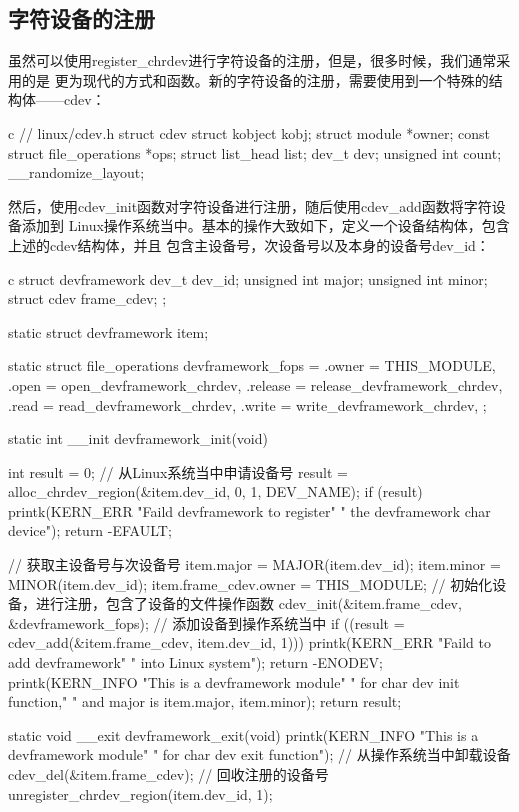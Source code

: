 \subsection{字符设备的注册}
虽然可以使用register\_chrdev进行字符设备的注册，但是，很多时候，我们通常采用的是
更为现代的方式和函数。新的字符设备的注册，需要使用到一个特殊的结构体——cdev：
\begin{code-block}{c}
// linux/cdev.h
struct cdev {
        struct kobject kobj;
        struct module *owner;
        const struct file_operations *ops;
        struct list_head list;
        dev_t dev;
        unsigned int count;
} __randomize_layout;
\end{code-block}
然后，使用cdev\_init函数对字符设备进行注册，随后使用cdev\_add函数将字符设备添加到
Linux操作系统当中。基本的操作大致如下，定义一个设备结构体，包含上述的cdev结构体，并且
包含主设备号，次设备号以及本身的设备号dev\_id：
\begin{code-block}{c}
struct devframework {
        dev_t dev_id;
        unsigned int major;
        unsigned int minor;
        struct cdev frame_cdev;
};

static struct devframework item;

static struct file_operations devframework_fops = {
        .owner = THIS_MODULE,
        .open = open_devframework_chrdev,
        .release = release_devframework_chrdev,
        .read = read_devframework_chrdev,
        .write = write_devframework_chrdev,
};

static int __init devframework_init(void)
{
        int result = 0;
        // 从Linux系统当中申请设备号
        result = alloc_chrdev_region(&item.dev_id, 0, 1, DEV_NAME);
        if (result) {
                printk(KERN_ERR
                        "Faild devframework to register"
                        " the devframework char device\n");
                return -EFAULT;
        }

        // 获取主设备号与次设备号
        item.major = MAJOR(item.dev_id);
        item.minor = MINOR(item.dev_id);
        item.frame_cdev.owner = THIS_MODULE;
        // 初始化设备，进行注册，包含了设备的文件操作函数
        cdev_init(&item.frame_cdev, &devframework_fops);
        // 添加设备到操作系统当中
        if ((result = cdev_add(&item.frame_cdev, item.dev_id, 1))){
                printk(KERN_ERR "Faild to add devframework"
                                " into Linux system\n");
                return -ENODEV;
        }
        printk(KERN_INFO
                "This is a devframework module"
                " for char dev init function,"
                " and major is %
                item.major, item.minor);
        return result;
}

static void __exit devframework_exit(void)
{
        printk(KERN_INFO
                "This is a devframework module"
                " for char dev exit function\n");
        // 从操作系统当中卸载设备
        cdev_del(&item.frame_cdev);
        // 回收注册的设备号
        unregister_chrdev_region(item.dev_id, 1);
}
\end{code-block}


